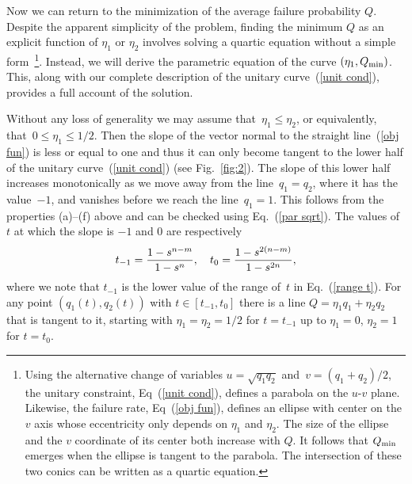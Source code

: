 \documentclass[aps,prl,twocolumn,showpacs]{revtex4}
\begin{document}
Now we can return to the minimization of the average failure probability $Q$. Despite the apparent simplicity of the problem, finding the minimum $Q$ as an explicit function of $\eta_1$ or $\eta_2$ involves solving a quartic equation without a simple form~\footnote{%
%
%
%
Using the alternative change of variables $u = \sqrt{q_1 q_2}$ and~$v = (q_1 + q_2)/2$, the unitary constraint, Eq~(\ref{unit cond}), defines a parabola on the $u$-$v$ plane.
Likewise, the failure rate, Eq~(\ref{obj fun}), defines an ellipse with center on the $v$ axis whose eccentricity only depends on $\eta_1$ and $\eta_2$. The size of the ellipse and the $v$ coordinate of its center both increase with $Q$.
%
It follows that $Q_{\rm min}$ emerges when the ellipse is tangent to the parabola. The intersection of these two conics can be written as a quartic equation.
%
%
%
%
}.
%
 Instead, we will derive the parametric equation of the curve $(\eta_1,Q_{\rm min})$. This, along with our complete description of the unitary curve~(\ref{unit cond}), provides a full account of the solution.

Without any loss of generality we may assume that~$\eta_1\le\eta_2$, or equivalently,  that~$0\le\eta_1\le 1/2$. Then the slope of the vector normal  to the straight line~(\ref{obj fun}) is less or equal to one and thus it can only become tangent to the lower half of the unitary curve~(\ref{unit cond}) (see Fig.~\ref{fig:2}). %
The slope of this lower half increases monotonically as we move away from the line~$q_1=q_2$, where it has the value~$-1$, and vanishes before we reach the line~$q_1=1$. This follows from the properties (a)--(f) above and can be checked using  Eq.~(\ref{par sqrt}). The values of $t$ at which the slope is $-1$ and $0$ are respectively
%
\begin{equation}
t_{-1}={1-s^{n-m}\over 1-s^n},\quad
t_0={1-s^{2(n-m)}\over 1-s^{2n}},
\label{t's}
\end{equation}
%
where we note that $t_{-1}$ is the lower value of the range of~$t$ in Eq.~(\ref{range t}). For any point $(q_1(t),q_2(t))$ with $t\in[t_{-1},t_0]$ there is a line $Q=\eta_1 q_1+\eta_2 q_2$ that is tangent to it, starting with $\eta_1=\eta_2=1/2$ for $t=t_{-1}$ up to $\eta_1=0$, $\eta_2=1$ for $t=t_0$. 
\end{document}
